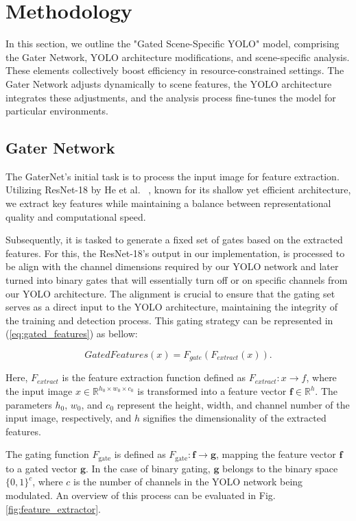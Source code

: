 \documentclass[runningheads]{llncs}
\begin{document}
\section{Methodology}
In this section, we outline the "Gated Scene-Specific YOLO" model, comprising the Gater Network, YOLO architecture modifications, and scene-specific analysis. These elements collectively boost efficiency in resource-constrained settings. The Gater Network adjusts dynamically to scene features, the YOLO architecture integrates these adjustments, and the analysis process fine-tunes the model for particular environments.

\subsection{Gater Network}
The GaterNet's initial task is to process the input image for feature extraction. Utilizing ResNet-18 by He et al. ~\cite{he2016deep}, known for its shallow yet efficient architecture, we extract key features while maintaining a balance between representational quality and computational speed.

Subsequently, it is tasked to generate a fixed set of gates based on the extracted features. For this, the ResNet-18's output in our implementation, is processed to be align with the channel dimensions required by our YOLO network and later turned into binary gates that will essentially turn off or on specific channels from our YOLO architecture. The alignment is crucial to ensure that the gating set serves as a direct input to the YOLO architecture, maintaining the integrity of the training and detection process. This gating strategy can be represented in  (\ref{eq:gated_features}) as bellow:

\begin{equation}
    GatedFeatures(x) = F_{gate}(F_{extract}(x)).
    \label{eq:gated_features}
\end{equation}

Here, $F_{extract}$ is the feature extraction function defined as $F_{extract}: x \rightarrow f$, where the input image $x \in \mathbb{R}^{h_0 \times w_0 \times c_0} $ is transformed into a feature vector \( \mathbf{f} \in \mathbb{R}^h \). The parameters \( h_0 \), \( w_0 \), and \( c_0 \) represent the height, width, and channel number of the input image, respectively, and \( h \) signifies the dimensionality of the extracted features.

The gating function \( F_{\text{gate}} \) is defined as \( F_{\text{gate}}: \mathbf{f} \rightarrow \mathbf{g} \), mapping the feature vector \( \mathbf{f} \) to a gated vector \( \mathbf{g} \). In the case of binary gating, \( \mathbf{g} \) belongs to the binary space \( \{0,1\}^c \), where \( c \) is the number of channels in the YOLO network being modulated. An overview of this process can be evaluated in Fig. \ref{fig:feature_extractor}.
\end{document}

